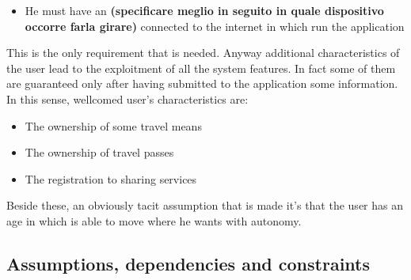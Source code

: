 \begin{itemize}
\item He must have an \textbf{(specificare meglio in seguito in quale dispositivo occorre farla girare)} connected to the internet in which run the application
\end{itemize}

This is the only requirement that is needed. Anyway additional characteristics of the user lead to the exploitment of  all the system features. In fact some of them are guaranteed only after having submitted to the application some information.
In this sense, wellcomed user's characteristics are:

\begin{itemize}
\item The ownership of some travel means
\item The ownership of travel passes
\item The registration to sharing services
\end{itemize}

Beside these, an obviously tacit assumption that is made it's that the user has an age in which is able to move where he wants with autonomy.


\subsection{ Assumptions, dependencies and constraints}

